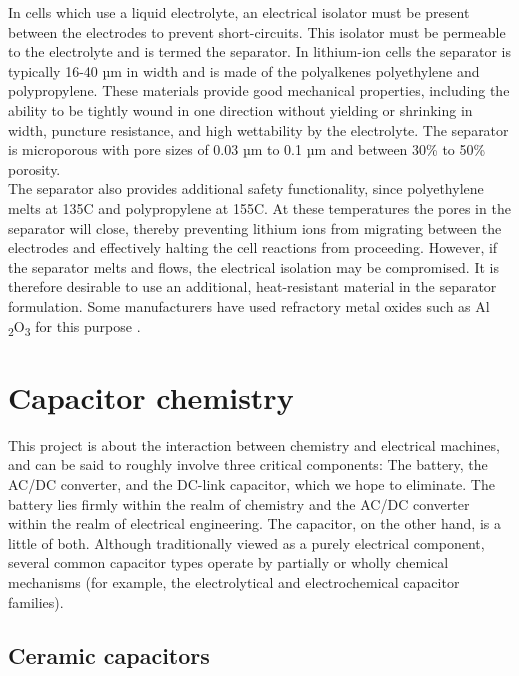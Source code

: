 \documentclass[12pt]{article} %
\begin{document}
In cells which use a liquid electrolyte, an electrical isolator must be present between the electrodes to prevent short-circuits.
This isolator must be permeable to the electrolyte and is termed the separator.
In lithium-ion cells the separator is typically 16-40 µm in width and is made of the polyalkenes polyethylene and polypropylene.
These materials provide good mechanical properties, including the ability to be tightly wound in one direction without yielding or shrinking in width, puncture resistance, and high wettability by the electrolyte.
The separator is microporous with pore sizes of 0.03 µm to 0.1 µm and between 30\% to 50\% porosity\cite{reddy_thomas_section_2011-5}.
\\
The separator also provides additional safety functionality, since polyethylene melts at 135\degree C and polypropylene at 155\degree C.
At these temperatures the pores in the separator will close, thereby preventing lithium ions from migrating between the electrodes and effectively halting the cell reactions from proceeding.
However, if the separator melts and flows, the electrical isolation may be compromised.
It is therefore desirable to use an additional, heat-resistant material in the separator formulation.
Some manufacturers have used refractory metal oxides such as Al \textsubscript{2}O\textsubscript{3} for this purpose \cite{reddy_thomas_section_2011-5}.


\section{Capacitor chemistry}

This project is about the interaction between chemistry and electrical machines, and can be said to roughly involve three critical components: The battery, the AC/DC converter, and the DC-link capacitor, which we hope to eliminate.
The battery lies firmly within the realm of chemistry and the AC/DC converter within the realm of electrical engineering.
The capacitor, on the other hand, is a little of both.
Although traditionally viewed as a purely electrical component, several common capacitor types operate by partially or wholly chemical mechanisms (for example, the electrolytical and electrochemical capacitor families).

\subsection{Ceramic capacitors}
\end{document}
